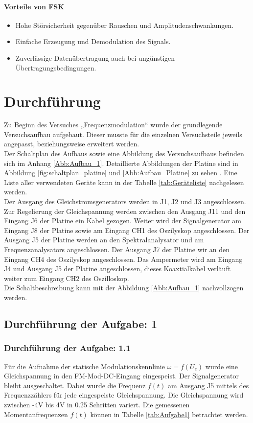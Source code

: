 \documentclass[12pt]{scrartcl}
\begin{document}
\paragraph{Vorteile von FSK}
\begin{itemize}
    \item Hohe Störsicherheit gegenüber Rauschen und Amplitudenschwankungen.
    \item Einfache Erzeugung und Demodulation des Signals.
    \item Zuverlässige Datenübertragung auch bei ungünstigen Übertragungsbedingungen.
\end{itemize}

\section{Durchführung}
Zu Beginn des Versuches „Frequenzmodulation“ wurde der grundlegende Versuchsaufbau aufgebaut. 
Dieser musste für die einzelnen Versuchsteile jeweils angepasst, beziehungsweise erweitert werden.\\
Der Schaltplan des Aufbaus sowie eine Abbildung des Versuchsaufbaus befinden sich im Anhang \ref{Abb:Aufbau_1}.
Detaillierte Abbildungen der Platine sind in Abbildung \ref{fig:schaltplan_platine} und \ref{Abb:Aufbau_Platine} zu sehen \cite{Labor_Frequenzmodulation}.
Eine Liste aller verwendeten Geräte kann in der Tabelle \ref{tab:Geräteliste} nachgelesen werden.\\
Der Ausgang des Gleichstromsgenerators werden in J1, J2 und J3 angeschlossen.
Zur Regelierung der Gleichspannung werden zwischen den Ausgang J11 und den Eingang J6 der Platine ein Kabel gezogen.
Weiter wird der Signalgenerator am Eingang J8 der Platine sowie am Eingang CH1 des Oszilyskop angeschlossen.
Der Ausgang J5 der Platine werden an den Spektralanalysator und am Frequenzanalysators angeschlossen.
Der Ausgang J7 der Platine wir an den Eingang CH4 des Oszilyskop angeschlossen.
Das Ampermeter wird am Eingang J4 und Ausgang J5 der Platine angeschlossen, dieses Koaxtialkabel verläuft weiter zum Eingang CH2 des Oszilloskop. \\
Die Schaltbeschreibung kann mit der Abbildung \ref{Abb:Aufbau_1} nachvollzogen werden.



\subsection{Durchführung der Aufgabe:  1}
\subsubsection*{Durchführung der Aufgabe: 1.1}
Für die Aufnahme der statische Modulationskennlinie $\omega =f\left(U_e\right)$ wurde eine Gleichspannung in den FM-Mod-DC-Eingang eingespeist.
Der Signalgenerator bleibt ausgeschaltet.
Dabei wurde die Frequenz $f\left(t\right)$ am Ausgang J5 mittels des Frequenzzählers für jede eingespeiste Gleichspannung. 
Die Gleichspannung wird zwischen -4V bis 4V in 0.25 Schritten variert. 
Die gemessenen Momentanfrequenzen $f\left(t\right)$  können in Tabelle \ref{tab:Aufgabe1} betrachtet werden.
\end{document}
